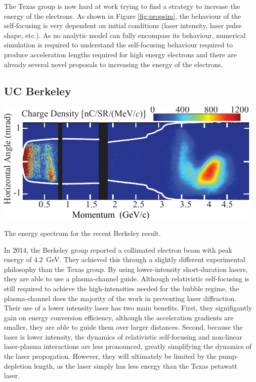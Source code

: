 \documentclass[12pt,letter]{article}
\begin{document}
The Texas group is now hard at work trying to find a strategy to increase the
energy of the electrons. As
shown in Figure \ref{fig:propsim}, the behaviour of the self-focusing is very
dependent on initial conditions (laser intensity, laser pulse shape, etc.). As
no analytic model can fully encompass its behaviour, numerical simulation is
required to understand the self-focusing behaviour required to produce
acceleration lengths required for high energy electrons and there are already
several novel proposals to increasing the energy of the electrons\cite{}.

\subsection{UC Berkeley}

\begin{marginfigure}
    \includegraphics[width=\marginparwidth]{../figures/esaenergy.pdf}
    \caption{The energy spectrum for the recent Berkeley result.}
\end{marginfigure}

In 2014, the Berkeley group reported a collimated electron beam with peak
energy of \SI{4.2}{\giga \electronvolt}. They achieved this through a slightly
different experimental philosophy than the Texas group. By using lower-intensity
short-duration lasers, they are able to use a plasma-channel guide. Although
relativistic self-focusing is still required to achieve the high-intensities
needed for the bubble regime, the plasma-channel does the majority of the work
in preventing laser diffraction. Their use of a lower intensity laser has two
main benefits. First, they signifigantly gain on energy conversion efficiency,
although the acceleration gradients are smaller, they are able to guide them
over larger distances. Second, because the laser is lower intensity, the dynamics
of relativistic self-focusing and non-linear laser-plasma interactions are less
pronounced, greatly simplifying the dynamics of the laser propogation. However,
they will ultimately be limited by the pump-depletion length, as the laser
simply has less energy than the Texas petawatt laser.
\end{document}
